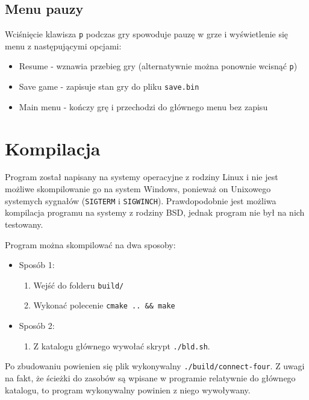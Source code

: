\documentclass{article}
\begin{document}
\subsection*{Menu pauzy}

Wciśnięcie klawisza \texttt{p} podczas gry spowoduje pauzę w grze i wyświetlenie się menu z następującymi opcjami:
\begin{itemize}
    \item Resume - wznawia przebieg gry (alternatywnie można ponownie wcisnąć \texttt{p})
    \item Save game - zapisuje stan gry do pliku \texttt{save.bin}
    \item Main menu - kończy grę i przechodzi do głównego menu bez zapisu
\end{itemize}

\section{Kompilacja}

Program został napisany na systemy operacyjne z rodziny Linux i nie jest możliwe skompilowanie go na system Windows,
ponieważ on Unixowego systemych sygnałów (\texttt{SIGTERM} i \texttt{SIGWINCH}). Prawdopodobnie jest możliwa kompilacja
programu na systemy z rodziny BSD, jednak program nie był na nich testowany.

Program można skompilować na dwa sposoby:
    \begin{itemize}
         
    \item Sposób 1:
        \begin{enumerate}
            \item Wejść do folderu  \texttt{build/}
            \item Wykonać polecenie \texttt{cmake .. \&\& make}
        \end{enumerate}

    \item Sposób 2:
        \begin{enumerate}
            \item Z katalogu głównego wywołać skrypt \texttt{./bld.sh}.
        \end{enumerate}

    \end{itemize}

Po zbudowaniu powienien się plik wykonywalny \texttt{./build/connect-four}.
Z uwagi na fakt, że ścieżki do zasobów są wpisane w programie relatywnie 
do głównego katalogu, to program wykonywalny powinien z niego wywoływany.
\end{document}
